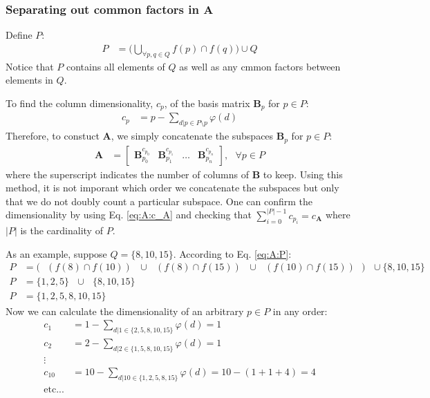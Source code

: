     \subsubsection{Separating out common factors in $\bm{A}$}
        Define $P$:
        \begin{align}\label{eq:A:commonFactors:P}
            P &= \Bigg( \bigcup_{\forall p, q \in Q} f(p) \cap f(q) \Bigg) \cup Q
        \end{align}
        Notice that $P$ contains all elements of $Q$ as well as any cmmon factors between elements in $Q$.

        To find the column dimensionality, $c_{p}$, of the basis matrix $\bm{B}_p$ for $p \in P$:
        \begin{align}\label{eq:A:commonFactors:cp}
            c_{p} &= p - \sum_{d|p \in P \setminus p} \varphi(d)
        \end{align}
        Therefore, to constuct $\bm{A}$, we simply concatenate the subspaces $\bm{B}_p$ for $p \in P$:
        \begin{align}\label{eq:A:commonFactors:A}
            \bm{A} &= \begin{bmatrix}
                    \bm{B}_{p_0}^{c_{p_0}} &
                    \bm{B}_{p_1}^{c_{p_1}} &
                    \hdots &
                    \bm{B}_{p_n}^{c_{p_n}}
                \end{bmatrix}
                , \text{ } \forall p \in P
        \end{align}
        where the superscript indicates the number of columns of $\bm{B}$ to keep. Using this method, it is not imporant which order we concatenate the subspaces but only that we do not doubly count a particular subspace. One can confirm the dimensionality by using Eq. \eqref{eq:A:c_A} and checking that $\sum_{i = 0}^{|P| - 1} c_{p_i} = c_{\bm{A}}$ where $|P|$ is the cardinality of $P$.

        As an example, suppose $Q = \{8, 10, 15\}$. According to Eq. \eqref{eq:A:P}:
        \begin{align*}
            P &=
                \big(
                \text{ } ( f(8) \cap f(10) ) \text{ } \cup
                \text{ } ( f(8) \cap f(15) ) \text{ } \cup
                \text{ } ( f(10) \cap f(15) )
                \text{ } \big)
                \text{ } \cup \{8, 10, 15\} \\
            P &= \{1, 2, 5\} \text{ } \cup \text{ } \{8, 10, 15\} \\
            P &= \{1, 2, 5, 8, 10, 15\}
        \end{align*}
        Now we can calculate the dimensionality of an arbitrary $p \in P$ in any order:
        \begin{align*}
            c_1 &= 1 - \sum_{d|1 \in \{2, 5, 8, 10, 15\}} \varphi(d) = 1 \\
            c_2 &= 2 - \sum_{d|2 \in \{1, 5, 8, 10, 15\}} \varphi(d) = 1 \\
            \vdots \\
            c_{10} &= 10 - \sum_{d|10 \in \{1, 2, 5, 8, 15\}} \varphi(d) = 10 - (1 + 1 + 4) = 4 \\
            \text{etc...}
        \end{align*}

